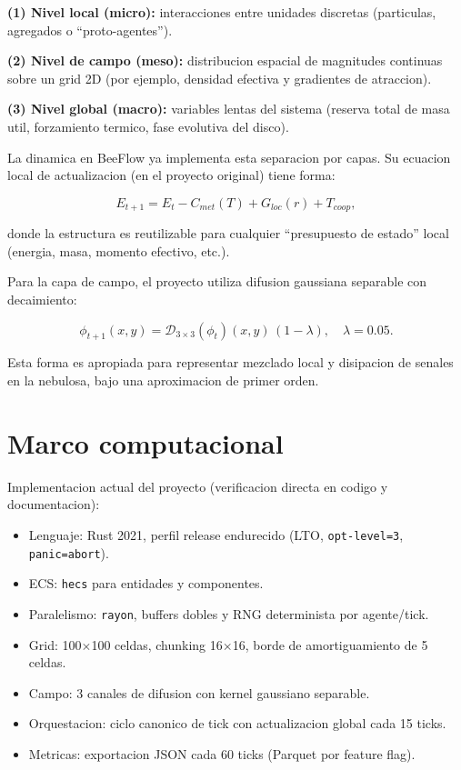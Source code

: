 \documentclass[11pt]{article}
\begin{document}
\textbf{(1) Nivel local (micro):} interacciones entre unidades discretas (particulas, agregados o ``proto-agentes'').

\textbf{(2) Nivel de campo (meso):} distribucion espacial de magnitudes continuas sobre un grid 2D (por ejemplo, densidad efectiva y gradientes de atraccion).

\textbf{(3) Nivel global (macro):} variables lentas del sistema (reserva total de masa util, forzamiento termico, fase evolutiva del disco).

La dinamica en BeeFlow ya implementa esta separacion por capas. Su ecuacion local de actualizacion (en el proyecto original) tiene forma:

\[
E_{t+1} = E_t - C_{met}(T) + G_{loc}(r) + T_{coop},
\]

donde la estructura es reutilizable para cualquier ``presupuesto de estado'' local (energia, masa, momento efectivo, etc.).

Para la capa de campo, el proyecto utiliza difusion gaussiana separable con decaimiento:

\[
\phi_{t+1}(x,y) = \mathcal{D}_{3\times 3}(\phi_t)(x,y)\,(1-\lambda),\quad \lambda = 0.05.
\]

Esta forma es apropiada para representar mezclado local y disipacion de senales en la nebulosa, bajo una aproximacion de primer orden.

\section*{Marco computacional}

Implementacion actual del proyecto (verificacion directa en codigo y documentacion):

\begin{itemize}
  \item Lenguaje: Rust 2021, perfil release endurecido (LTO, \texttt{opt-level=3}, \texttt{panic=abort}).
  \item ECS: \texttt{hecs} para entidades y componentes.
  \item Paralelismo: \texttt{rayon}, buffers dobles y RNG determinista por agente/tick.
  \item Grid: 100\(\times\)100 celdas, chunking 16\(\times\)16, borde de amortiguamiento de 5 celdas.
  \item Campo: 3 canales de difusion con kernel gaussiano separable.
  \item Orquestacion: ciclo canonico de tick con actualizacion global cada 15 ticks.
  \item Metricas: exportacion JSON cada 60 ticks (Parquet por feature flag).
\end{itemize}
\end{document}
